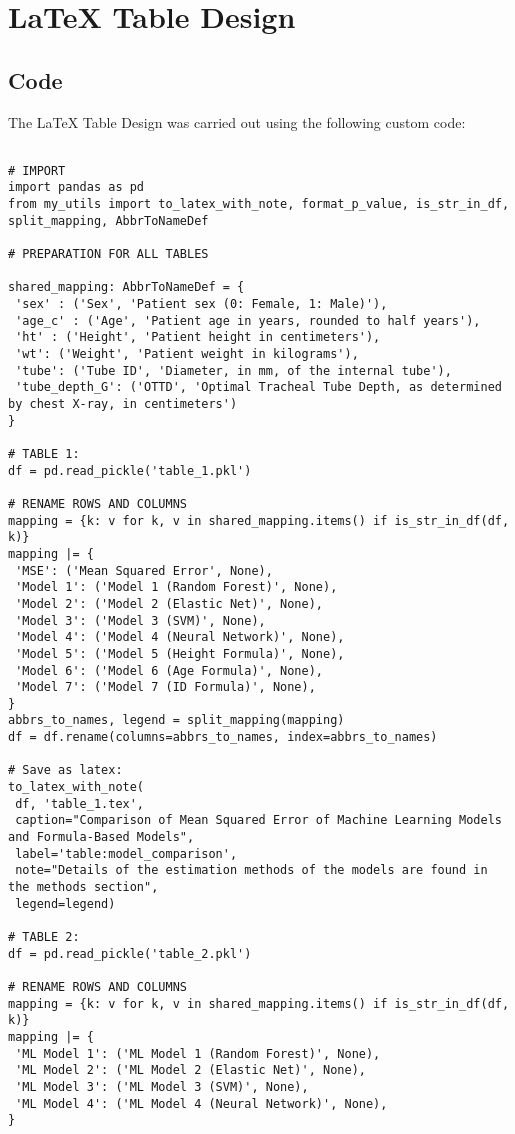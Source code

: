 \documentclass[11pt]{article}
\begin{document}
\section{LaTeX Table Design}
\subsection{{Code}}
The LaTeX Table Design was carried out using the following custom code:

\begin{verbatim}

# IMPORT
import pandas as pd
from my_utils import to_latex_with_note, format_p_value, is_str_in_df, split_mapping, AbbrToNameDef

# PREPARATION FOR ALL TABLES

shared_mapping: AbbrToNameDef = {
 'sex' : ('Sex', 'Patient sex (0: Female, 1: Male)'),
 'age_c' : ('Age', 'Patient age in years, rounded to half years'),
 'ht' : ('Height', 'Patient height in centimeters'),
 'wt': ('Weight', 'Patient weight in kilograms'),
 'tube': ('Tube ID', 'Diameter, in mm, of the internal tube'),
 'tube_depth_G': ('OTTD', 'Optimal Tracheal Tube Depth, as determined by chest X-ray, in centimeters')
}

# TABLE 1:
df = pd.read_pickle('table_1.pkl')

# RENAME ROWS AND COLUMNS 
mapping = {k: v for k, v in shared_mapping.items() if is_str_in_df(df, k)} 
mapping |= {
 'MSE': ('Mean Squared Error', None),
 'Model 1': ('Model 1 (Random Forest)', None),
 'Model 2': ('Model 2 (Elastic Net)', None),
 'Model 3': ('Model 3 (SVM)', None),
 'Model 4': ('Model 4 (Neural Network)', None),
 'Model 5': ('Model 5 (Height Formula)', None),
 'Model 6': ('Model 6 (Age Formula)', None),
 'Model 7': ('Model 7 (ID Formula)', None),
}
abbrs_to_names, legend = split_mapping(mapping)
df = df.rename(columns=abbrs_to_names, index=abbrs_to_names)

# Save as latex:
to_latex_with_note(
 df, 'table_1.tex',
 caption="Comparison of Mean Squared Error of Machine Learning Models and Formula-Based Models", 
 label='table:model_comparison',
 note="Details of the estimation methods of the models are found in the methods section",
 legend=legend)

# TABLE 2:
df = pd.read_pickle('table_2.pkl')

# RENAME ROWS AND COLUMNS 
mapping = {k: v for k, v in shared_mapping.items() if is_str_in_df(df, k)} 
mapping |= {
 'ML Model 1': ('ML Model 1 (Random Forest)', None),
 'ML Model 2': ('ML Model 2 (Elastic Net)', None),
 'ML Model 3': ('ML Model 3 (SVM)', None),
 'ML Model 4': ('ML Model 4 (Neural Network)', None),
}


\end{verbatim}
\end{document}
